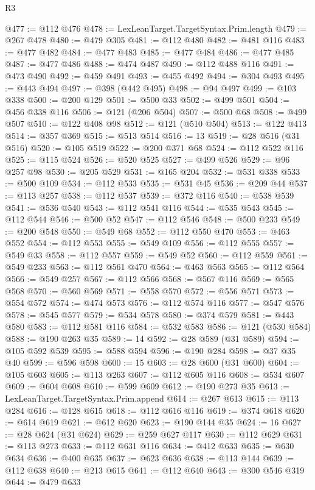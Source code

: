 \begin{lexlean}{R3}
\begin{coremodule}
{{{{{{{{{{{{{{{{{{{{{{{{{{{{{{{{{{{{{{{{{{{{{{{{{{{{{{{{{{{{{{{{{{{{{{{{{{{@477 := @112 @476
@478 := LexLeanTarget.TargetSyntax.Prim.length
@479 := @267 @478
@480 := @479 @305
@481 := @112 @480
@482 := @481 @116
@483 := @477 @482
@484 := @477 @483
@485 := @477 @484
@486 := @477 @485
@487 := @477 @486
@488 := @474 @487
@490 := @112 @488 @116
@491 := @473 @490
@492 := @459 @491
@493 := @455 @492
@494 := @304 @493
@495 := @443 @494
@497 := @398 (@442 @495)
@498 := @94 @497
@499 := @103 @338
@500 := @200 @129
@501 := @500 @33
@502 := @499 @501
@504 := @456 @338 @116
@506 := @121 (@206 @504)
@507 := @500 @68
@508 := @499 @507
@510 := @122 @408 @98
@512 := @121 (@510 @504)
@513 := @122 @413
@514 := @357 @369
@515 := @513 @514
@516 := 13
@519 := @28 @516 (@31 @516)
@520 := @105 @519
@522 := @200 @371 @68
@524 := @112 @522 @116
@525 := @115 @524
@526 := @520 @525
@527 := @499 @526
@529 := @96 @257 @98
@530 := @205 @529
@531 := @165 @204
@532 := @531 @338
@533 := @500 @109
@534 := @112 @533
@535 := @531 @45
@536 := @209 @44
@537 := @113 @257
@538 := @112 @537
@539 := @372 @116
@540 := @538 @539
@541 := @536 @540
@543 := @112 @541 @116
@544 := @535 @543
@545 := @112 @544
@546 := @500 @52
@547 := @112 @546
@548 := @500 @233
@549 := @200 @548
@550 := @549 @68
@552 := @112 @550 @470
@553 := @463 @552
@554 := @112 @553
@555 := @549 @109
@556 := @112 @555
@557 := @549 @33
@558 := @112 @557
@559 := @549 @52
@560 := @112 @559
@561 := @549 @233
@563 := @112 @561 @470
@564 := @463 @563
@565 := @112 @564
@566 := @549 @257
@567 := @112 @566
@568 := @567 @116
@569 := @565 @568
@570 := @560 @569
@571 := @558 @570
@572 := @556 @571
@573 := @554 @572
@574 := @474 @573
@576 := @112 @574 @116
@577 := @547 @576
@578 := @545 @577
@579 := @534 @578
@580 := @374 @579
@581 := @443 @580
@583 := @112 @581 @116
@584 := @532 @583
@586 := @121 (@530 @584)
@588 := @190 @263 @35
@589 := 14
@592 := @28 @589 (@31 @589)
@594 := @105 @592 @539
@595 := @588 @594
@596 := @190 @284
@598 := @37 @35 @40
@599 := @596 @598
@600 := 15
@603 := @28 @600 (@31 @600)
@604 := @105 @603
@605 := @113 @263
@607 := @112 @605 @116
@608 := @534 @607
@609 := @604 @608
@610 := @599 @609
@612 := @190 @273 @35
@613 := LexLeanTarget.TargetSyntax.Prim.append
@614 := @267 @613
@615 := @113 @284
@616 := @128 @615
@618 := @112 @616 @116
@619 := @374 @618
@620 := @614 @619
@621 := @612 @620
@623 := @190 @144 @35
@624 := 16
@627 := @28 @624 (@31 @624)
@629 := @259 @627 @117
@630 := @112 @629
@631 := @113 @273
@633 := @112 @631 @116
@634 := @412 @633
@635 := @630 @634
@636 := @400 @635
@637 := @623 @636
@638 := @113 @144
@639 := @112 @638
@640 := @213 @615
@641 := @112 @640
@643 := @300 @546 @319
@644 := @479 @633
}}}}}}}}}}}}}}}}}}}}}}}}}}}}}}}}}}}}}}}}}}}}}}}}}}}}}}}}}}}}}}}}}}}}}}}}}}}
\end{coremodule}
\end{lexlean}
